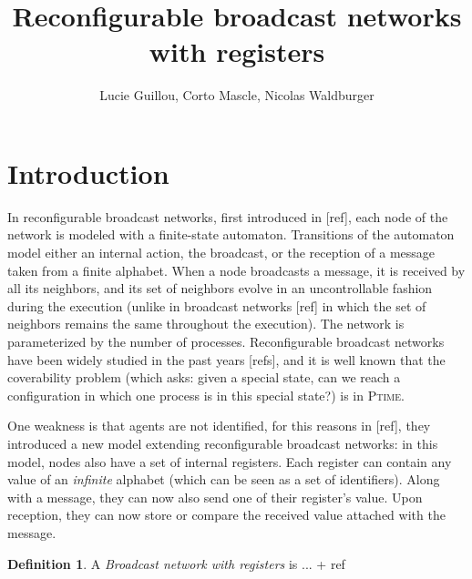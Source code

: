 \documentclass{article}
\title{Reconfigurable broadcast networks with registers}
\author{Lucie Guillou, Corto Mascle, Nicolas Waldburger}
\date{}
\theoremstyle{definition}
\newtheorem{definition}[theorem]{Definition}
\begin{document}
	
	\maketitle
	
	\section{Introduction}
	
	
	
	In reconfigurable broadcast networks, first introduced in [ref], each node of the network is modeled with a finite-state automaton. Transitions of the automaton model either an internal action, the broadcast, or the reception of a message taken from a finite alphabet. When a node broadcasts a message, it is received by all its neighbors, and its set of neighbors evolve in an uncontrollable fashion during the execution (unlike in broadcast networks [ref] in which the set of neighbors remains the same throughout the execution). The network is parameterized by the number of processes. Reconfigurable broadcast networks have been widely studied in the past years [refs], and it is well known that the coverability problem (which asks: given a special state, can we reach a configuration in which one process is in this special state?) is in \textsc{Ptime}.
	
	One weakness is that agents are not identified, for this reasons in [ref], they introduced a new model extending reconfigurable broadcast networks: in this model, nodes also have a set of internal registers. Each register can contain any value of an \emph{infinite} alphabet (which can be seen as a set of identifiers). Along with a message, they can now also send one of their register's value. Upon reception, they can now store or compare the received value attached with the message.
	
	\begin{definition}
		A \emph{Broadcast network with registers} is ... + ref
	\end{definition}
	
\end{document}
